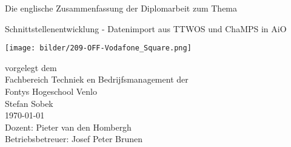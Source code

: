 

\begin{titlepage}
\vspace{4em}
\center
 \Large{\textsf{Die englische Zusammenfassung der Diplomarbeit zum Thema}}
 \vspace{1em}

\Huge{\textsf{Schnittstellenentwicklung - Datenimport aus TTWOS und ChaMPS in AiO}}
\vspace{1em}
\\
\begin{center}
	\texttt{[image: bilder/209-OFF-Vodafone\_Square.png]}
\end{center}

\vspace{1em}
\Large{
\textsf{
vorgelegt dem\\
Fachbereich Techniek en Bedrijfsmanagement der\\Fontys Hogeschool Venlo
}
}
\vspace{2em}
\\
\Large{
\textsf{
Stefan Sobek\\
\today
\vspace{2em}
\\
Dozent: Pieter van den Hombergh\\
Betriebsbetreuer: Josef Peter Brunen
}
}
\end{titlepage}